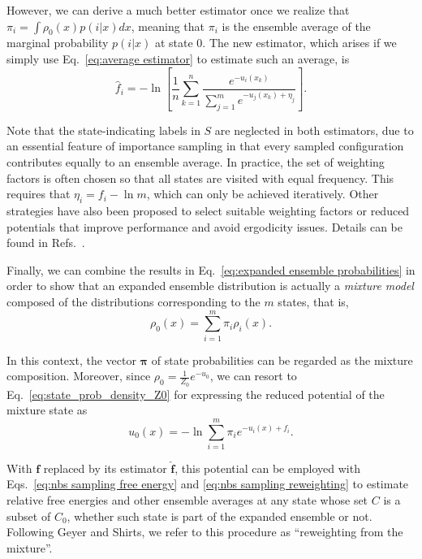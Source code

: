 \documentclass[aip,jcp,reprint,amsmath,amssymb]{revtex4-1}
\newcommand{\vt}[1]{\boldsymbol{\mathbf{#1}}}           %
\begin{document}
However, we can derive a much better estimator\cite{Ding_2017} once we realize that $\pi_i = \int \rho_0(x) p(i|x) dx$, meaning that $\pi_i$ is the ensemble average of the marginal probability $p(i|x)$ at state $0$. The new estimator, which arises if we simply use Eq.~\eqref{eq:average estimator} to estimate such an average, is
\begin{equation}
\label{eq:expanded ensemble FEP estimator}
\hat f_i = -\ln \left[ \frac{1}{n}\sum_{k=1}^n \frac{e^{-u_i(x_k)}}{\sum_{j=1}^m e^{-u_j(x_k) + \eta_j}} \right].
\end{equation}

Note that the state-indicating labels in $S$ are neglected in both estimators, due to an essential feature of importance sampling in that every sampled configuration contributes equally to an ensemble average. In practice, the set of weighting factors is often chosen so that all states are visited with equal frequency. This requires that $\eta_i = f_i - \ln m$, which can only be achieved iteratively. Other strategies have also been proposed to select suitable weighting factors or reduced potentials that improve performance and avoid ergodicity issues. Details can be found in Refs.~.

Finally, we can combine the results in Eq.~\eqref{eq:expanded ensemble probabilities} in order to show that an expanded ensemble distribution is actually a \textit{mixture model}\cite{Lindsay_1995, Marin_2005} composed of the distributions corresponding to the $m$ states, that is,
\begin{equation}
\label{eq:mixture ensemble}
\rho_0(x) = \sum_{i=1}^m \pi_i \rho_i(x).
\end{equation}

In this context, the vector $\vt \pi$ of state probabilities can be regarded as the mixture composition. Moreover, since $\rho_0 = \frac{1}{Z_0}e^{-u_0}$, we can resort to Eq.~\eqref{eq:state_prob_density_Z0} for expressing the reduced potential of the mixture state as
\begin{equation}
\label{eq:mixture potential}
u_0(x) = -\ln \sum_{i=1}^m \pi_i e^{-u_i(x) + f_i}.
\end{equation}

With $\vt f$ replaced by its estimator $\hat{\vt f}$, this potential can be employed with Eqs.~\eqref{eq:nbs sampling free energy} and \eqref{eq:nbs sampling reweighting} to estimate relative free energies and other ensemble averages at any state whose set $C$ is a subset of $C_0$, whether such state is part of the expanded ensemble or not. Following Geyer\cite{Geyer_1994} and Shirts,\cite{Shirts_2017} we refer to this procedure as ``reweighting from the mixture''.
\end{document}

